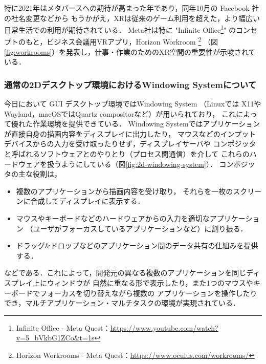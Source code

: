 特に2021年はメタバースへの期待が高まった年であり，同年10月の Facebook 社の社名変更などから
もうかがえ，XRは従来のゲーム利用を超えた，より幅広い日常生活での利用が期待されている．
Meta社は特に
"Infinite Office\footnote{Infinite Office - Meta Quest：\url{https://www.youtube.com/watch?v=5_bVkbG1ZCo&t=1s}}"
のコンセプトのもと，ビジネス会議用VRアプリ，Horizon Workroom
\footnote{Horizon Workrooms - Meta Quest：\url{https://www.oculus.com/workrooms/}}
（図\ref{fig:workrooms}）を発表し，仕事・作業のためのXR空間の重要性が示唆されている．


\subsubsection{通常の2Dデスクトップ環境におけるWindowing Systemについて}

今日において GUI デスクトップ環境ではWindowing System
（Linuxでは X11やWayland，macOSではQuartz compositorなど）が用いられており，
これによって優れた作業環境を提供できている．
Windowing Systemではアプリケーションが直接自身の描画内容をディスプレイに出力したり，
マウスなどのインプットデバイスからの入力を受け取ったりせず，ディスプレイサーバや
コンポジッタと呼ばれるソフトウェアとのやりとり（プロセス間通信）を介して
これらのハードウェアを扱うようにしている（図\ref{fig:2d-windowing-system}）．
コンポジッタの主な役割は，
\begin{itemize}
  \item 複数のアプリケーションから描画内容を受け取り，
        それらを一枚のスクリーンに合成してディスプレイに表示する．
  \item マウスやキーボードなどのハードウェアからの入力を適切なアプリケーション
        （ユーザがフォーカスしているアプリケーションなど）に割り振る．
  \item ドラッグ\&ドロップなどのアプリケーション間のデータ共有の仕組みを提供する．
\end{itemize}
などである．これによって，開発元の異なる複数のアプリケーションを同じディスプレイ上にウィンドウが
自然に重なる形で表示したり，また1つのマウスやキーボードでフォーカスを切り替えながら複数の
アプリケーションを操作したりでき，マルチアプリケーション・マルチタスクの環境が実現されている．

